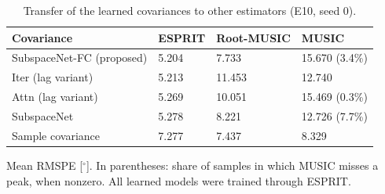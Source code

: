 \begin{table}[h!]
\centering
\small
\caption{Transfer of the learned covariances to other estimators (E10, seed 0).}
\label{tab:pnp}
\begin{tabular}{llll}
\toprule
Covariance & ESPRIT & Root-MUSIC & MUSIC \\
\midrule
SubspaceNet-FC (proposed) & 5.204 & 7.733 & 15.670 (3.4\%) \\
Iter (lag variant) & 5.213 & 11.453 & 12.740 \\
Attn (lag variant) & 5.269 & 10.051 & 15.469 (0.3\%) \\
SubspaceNet & 5.278 & 8.221 & 12.726 (7.7\%) \\
\midrule
Sample covariance & 7.277 & 7.437 & 8.329 \\
\hline
\end{tabular}
\par\smallskip\parbox{0.95\textwidth}{\footnotesize Mean RMSPE [$^\circ$]. In parentheses: share of samples in which MUSIC misses a peak, when nonzero. All learned models were trained through ESPRIT.}
\end{table}
